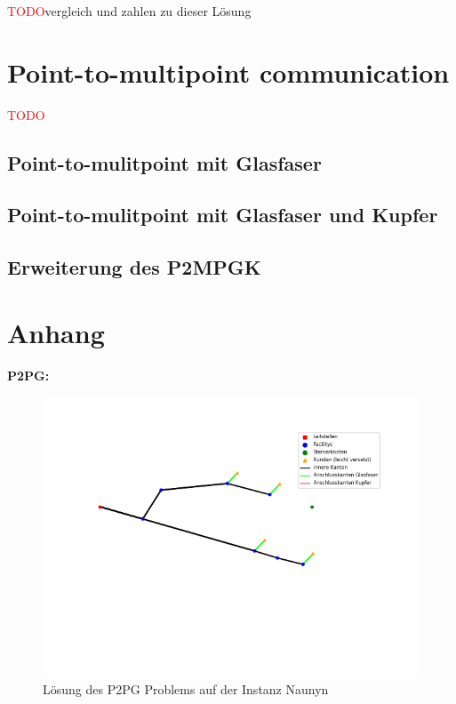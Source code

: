 \documentclass[11pt,a4paper]{article}
\newcommand{\TODO}{\textcolor{red}{TODO}}
\theoremstyle{my_th_style1}
\begin{document}
\TODO vergleich und zahlen zu dieser Lösung

\section{Point-to-multipoint communication}
\TODO
 
 \subsection{Point-to-mulitpoint mit Glasfaser}
 \subsection{Point-to-mulitpoint mit Glasfaser und Kupfer}
 \subsection{Erweiterung des P2MPGK}
 
\newpage

\renewcommand{\refname}{Literaturverzeichnis}

\thispagestyle{empty}
\newpage
\appendix
\section*{Anhang}
\textbf{P2PG:}
\begin{figure}[h]
	\begin{center}
		\begin{minipage}{8.0cm}
			\includegraphics[width=1\textwidth]{./Bilder/P2PG_Naunyn}
			\caption{Lösung des P2PG Problems auf der Instanz Naunyn}
		\end{minipage}
	\end{center}
\end{figure}
\end{document}
